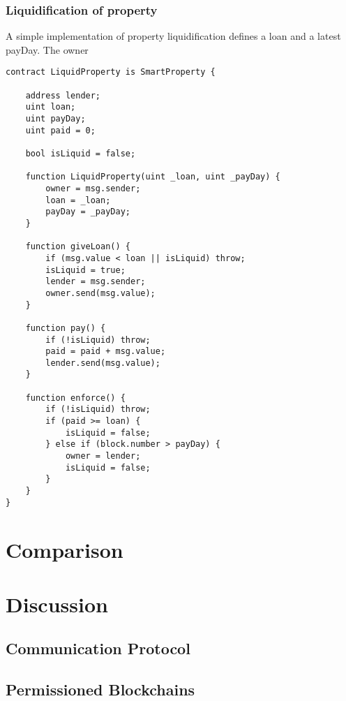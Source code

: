 \subsubsection{Liquidification of property}

A simple implementation of property liquidification defines a loan and a latest payDay. The owner  

\begin{lstlisting}[breaklines,basicstyle=\tiny]
contract LiquidProperty is SmartProperty {
    
    address lender;
    uint loan;
    uint payDay;
    uint paid = 0;
    
    bool isLiquid = false;
    
    function LiquidProperty(uint _loan, uint _payDay) {
        owner = msg.sender;
        loan = _loan;
        payDay = _payDay;
    }
    
    function giveLoan() {
        if (msg.value < loan || isLiquid) throw;
        isLiquid = true;
        lender = msg.sender;
        owner.send(msg.value);
    }
    
    function pay() {
        if (!isLiquid) throw;
        paid = paid + msg.value;
        lender.send(msg.value);
    }
    
    function enforce() {
        if (!isLiquid) throw;
        if (paid >= loan) {
            isLiquid = false;
        } else if (block.number > payDay) {
            owner = lender;
            isLiquid = false;
        }
    }
}
\end{lstlisting}

\section{Comparison}



\section{Discussion}

\subsection{Communication Protocol}

\subsection{Permissioned Blockchains}

